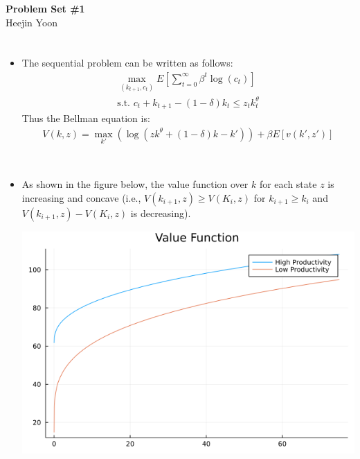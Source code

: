 \documentclass[11pt]{article}
\theoremstyle{definition}
\theoremstyle{definition}
\theoremstyle{definition}
\theoremstyle{definition}
\theoremstyle{definition}
\theoremstyle{definition}
\begin{document}
	\begin{center}
		\Large{\textbf{Problem Set \#1}}
		\\ Heejin Yoon
	\end{center}




\section{}
\begin{itemize}
	\item The sequential problem can be written as follows:
	\begin{equation*}
		\begin{split}
			\max_{(k_{t+1},c_{t})}E[\sum_{t=0}^{\infty}\beta^{t}\log(c_{t})]\\
			\text{s.t. } c_{t}+k_{t+1}-(1-\delta)k_{t}\le z_{t}k_{t}^{\theta}
		\end{split}
	\end{equation*}
	Thus the Bellman equation is:
	\begin{equation*}
		\begin{split}
			V(k,z)=\max_{k'}(\log(zk^{\theta}+(1-\delta)k-k'))+\beta E[v(k',z')]\\
		\end{split}
	\end{equation*}
\end{itemize}


\section{}
\begin{itemize}
	\item As shown in the figure below, the value function over $k$ for each state $z$ is increasing and concave (i.e., $V(k_{i+1},z)\ge V(K_{i},z)$ for $k_{i+1}\ge k_{i}$ and $V(k_{i+1},z) - V(K_{i},z)$ is decreasing).
	\begin{center}
		\includegraphics[width=.8\linewidth]{./julia/figure_valfunc_julia.png}
	\end{center}
\end{itemize}
\end{document}
